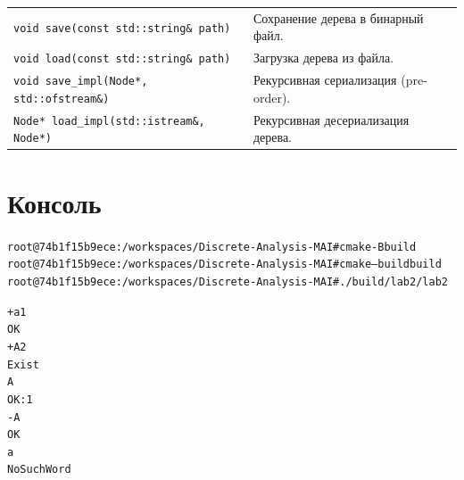 \begin{table}[!ht]
\centering
\begin{tabular}{|p{7.5cm}|p{7.5cm}|}
\hline
\rowcolor{lightgray}
\multicolumn{2}{|c|}{Сериализация} \\
\hline
\texttt{void save(const std::string\& path)} & Сохранение дерева в бинарный файл. \\
\hline
\texttt{void load(const std::string\& path)} & Загрузка дерева из файла. \\
\hline
\texttt{void save\_impl(Node*, std::ofstream\&)} & Рекурсивная сериализация (pre-order). \\
\hline
\texttt{Node* load\_impl(std::istream\&, Node*)} & Рекурсивная десериализация дерева. \\
\hline
\end{tabular}
\end{table}

\pagebreak

\section{Консоль}

\begin{alltt}
root@74b1f15b9ece:/workspaces/Discrete-Analysis-MAI# cmake -B build
root@74b1f15b9ece:/workspaces/Discrete-Analysis-MAI# cmake --build build
root@74b1f15b9ece:/workspaces/Discrete-Analysis-MAI# ./build/lab2/lab2

+ a 1
OK
+ A 2
Exist
A
OK: 1
- A
OK
a
NoSuchWord

\end{alltt}

\pagebreak